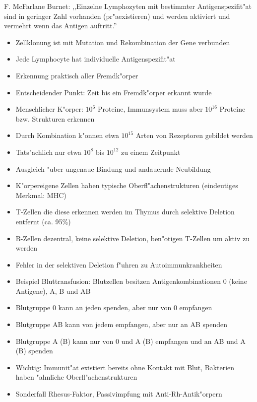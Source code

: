 \documentclass[10pt, a4]{seminar}
\begin{document}
\begin{slide}
F. McFarlane Burnet: ,,Einzelne Lymphozyten mit bestimmter Antigenspezifit"at sind in geringer Zahl vorhanden (pr"aexistieren) und werden aktiviert und vermehrt wenn das Antigen auftritt.''\\
\begin{itemize}
\item Zellklonung ist mit Mutation und Rekombination der Gene verbunden
\item Jede Lymphocyte hat individuelle Antigenspezifit"at
\item Erkennung praktisch aller Fremdk"orper
\item Entscheidender Punkt: Zeit bis ein Fremdk"orper erkannt wurde
\item Menschlicher K"orper: \(10^{6}\) Proteine, Immunsystem muss aber \(10^{16}\) Proteine bzw. Strukturen erkennen
\item Durch Kombination k"onnen etwa \(10^{15}\) Arten von Rezeptoren gebildet werden
\item Tats"achlich nur etwa \(10^{8}\) bis \(10^{12}\) zu einem Zeitpunkt
\item Ausgleich "uber ungenaue Bindung und andauernde Neubildung
\end{itemize}
\vfill
\end{slide}


\begin{slide}
\begin{itemize}
\item K"orpereigene Zellen haben typische Oberfl"achenstrukturen (eindeutiges Merkmal: MHC)
\item T-Zellen die diese erkennen werden im Thymus durch selektive Deletion entfernt (ca. 95\%)
\item B-Zellen dezentral, keine selektive Deletion, ben"otigen T-Zellen um aktiv zu werden
\item Fehler in der selektiven Deletion f"uhren zu Autoimmunkrankheiten
\item Beispiel Bluttransfusion: Blutzellen besitzen Antigenkombinationen 0 (keine Antigene), A, B und AB
\item Blutgruppe 0 kann an jeden spenden, aber nur von 0 empfangen
\item Blutgruppe AB kann von jedem empfangen, aber nur an AB spenden
\item Blutgruppe A (B) kann nur von 0 und A (B) empfangen und an AB und A (B) spenden
\item Wichtig: Immunit"at existiert bereits ohne Kontakt mit Blut, Bakterien haben "ahnliche Oberfl"achenstrukturen
\item Sonderfall Rhesus-Faktor, Passivimpfung mit Anti-Rh-Antik"orpern
\end{itemize}
\vfill
\end{slide}
\end{document}
